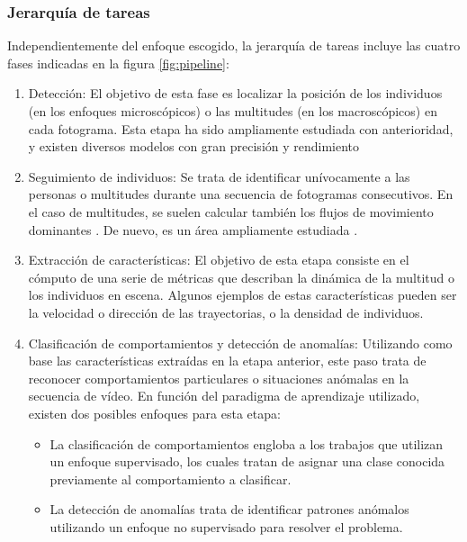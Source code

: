 \documentclass[../main.tex]{memoir}
\begin{document}
\subsubsection{Jerarquía de tareas}
\label{sec:crowd-analysis-pipeline}

Independientemente del enfoque escogido, la jerarquía de tareas
incluye las cuatro fases indicadas en la figura \ref{fig:pipeline}:

\begin{enumerate}
\item Detección: El objetivo de esta fase es localizar la posición de
  los individuos (en los enfoques microscópicos) o las multitudes (en
  los macroscópicos) en cada fotograma. Esta etapa ha sido ampliamente
  estudiada con anterioridad, y existen diversos modelos con gran
  precisión y rendimiento \cite{nguyen2016human}
\item Seguimiento de individuos: Se trata de identificar unívocamente
  a las personas o multitudes durante una secuencia de fotogramas
  consecutivos. En el caso de multitudes, se suelen calcular también
  los flujos de movimiento dominantes \cite{garate2009crowd}. De nuevo,
  es un área ampliamente estudiada \cite{ciaparrone2020deep}.
\item Extracción de características: El objetivo de esta etapa
  consiste en el cómputo de una serie de métricas que describan la
  dinámica de la multitud o los individuos en escena. Algunos ejemplos
  de estas características pueden ser la velocidad o dirección de las
  trayectorias, o la densidad de individuos.
\item Clasificación de comportamientos y detección de anomalías:
  Utilizando como base las características extraídas en la etapa
  anterior, este paso trata de reconocer comportamientos particulares
  o situaciones anómalas en la secuencia de vídeo. En función del
  paradigma de aprendizaje utilizado, existen dos posibles enfoques
  para esta etapa:
  \begin{itemize}
  \item La clasificación de comportamientos engloba a los trabajos que
    utilizan un enfoque supervisado, los cuales tratan de asignar una
    clase conocida previamente al comportamiento a clasificar.
  \item La detección de anomalías trata de identificar patrones anómalos
    utilizando un enfoque no supervisado para resolver el problema.
  \end{itemize}
\end{enumerate}
\end{document}
